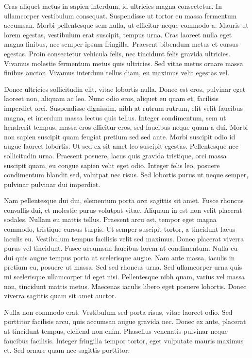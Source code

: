 \documentclass{homework}
\begin{document}
Cras aliquet metus in sapien interdum, id ultricies magna consectetur. In ullamcorper vestibulum consequat. Suspendisse ut tortor eu massa fermentum accumsan. Morbi pellentesque sem nulla, ut efficitur neque commodo a. Mauris ut lorem egestas, vestibulum erat suscipit, tempus urna. Cras laoreet nulla eget magna finibus, nec semper ipsum fringilla. Praesent bibendum metus et cursus egestas. Proin consectetur vehicula felis, nec tincidunt felis gravida ultricies. Vivamus molestie fermentum metus quis ultricies. Sed vitae metus ornare massa finibus auctor. Vivamus interdum tellus diam, eu maximus velit egestas vel.

Donec ultricies sollicitudin elit, vitae lobortis nulla. Donec est eros, pulvinar eget laoreet non, aliquam ac leo. Nunc odio eros, aliquet eu quam et, facilisis imperdiet orci. Suspendisse dignissim, nibh at rutrum rutrum, elit velit faucibus magna, et interdum massa lectus quis tellus. Integer condimentum, sem ut hendrerit tempus, massa eros efficitur eros, sed faucibus neque quam a dui. Morbi non sapien suscipit quam feugiat pretium sed sed ante. Morbi suscipit odio id augue laoreet lobortis. Ut sed ex sit amet leo suscipit egestas. Pellentesque nec sollicitudin urna. Praesent posuere, lacus quis gravida tristique, orci massa suscipit quam, eu congue sapien velit eget odio. Integer felis leo, posuere condimentum blandit sed, volutpat nec risus. Sed lobortis purus ut neque semper, pulvinar pulvinar dui imperdiet.

Nam pellentesque dui dui, elementum porta orci sagittis sit amet. Fusce rhoncus convallis dui, et molestie purus volutpat vitae. Aliquam in est non velit placerat sodales. Nullam eu mattis tellus. Praesent arcu est, tempor eget magna commodo, tristique cursus turpis. Ut semper suscipit tortor, a tincidunt lacus iaculis eu. Vestibulum tempus facilisis velit sed maximus. Donec placerat viverra purus vel tincidunt. Fusce accumsan faucibus lorem at condimentum. Nulla eu dui quis augue tempus porta at scelerisque augue. Nam ante massa, iaculis in pretium eu, posuere ut massa. Sed sed rhoncus urna. Sed ullamcorper urna quis mi scelerisque ullamcorper id eget nisi. Pellentesque nibh quam, varius vel massa non, tincidunt mattis metus. Maecenas iaculis libero eget posuere lobortis. Donec viverra sagittis quam sit amet auctor.

Nulla non commodo erat. Vestibulum sed porta risus, vitae laoreet odio. Sed porttitor facilisis arcu, quis accumsan augue gravida nec. Donec ex ante, placerat at tincidunt tempus, eleifend non enim. Phasellus venenatis pulvinar neque faucibus facilisis. Integer fringilla tempor tortor, eget vulputate mauris maximus et. Sed ornare quam nec sagittis porttitor.
\end{document}
